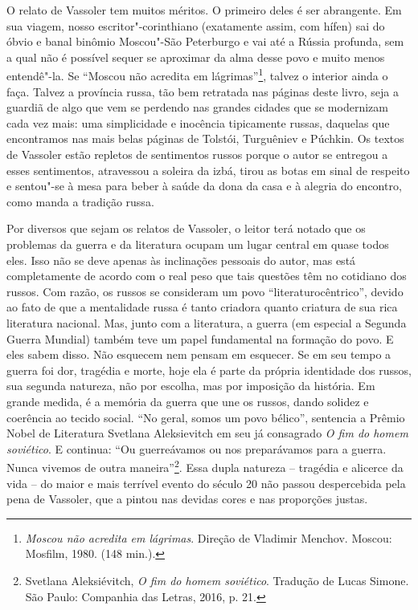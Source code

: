 O relato de Vassoler tem muitos méritos. O primeiro deles é ser
abrangente. Em sua viagem, nosso escritor"-corinthiano (exatamente assim,
com hífen) sai do óbvio e banal binômio Moscou"-São Peterburgo e vai até
a Rússia profunda, sem a qual não é possível sequer se aproximar da alma
desse povo e muito menos entendê"-la. Se ``Moscou não acredita em
lágrimas''\footnote{\emph{Moscou não acredita em lágrimas}. Direção de
  Vladimir Menchov. Moscou: Mosfilm, 1980. (148 min.).}, talvez o
interior ainda o faça. Talvez a província russa, tão bem retratada nas
páginas deste livro, seja a guardiã de algo que vem se perdendo nas
grandes cidades que se modernizam cada vez mais: uma simplicidade e
inocência tipicamente russas, daquelas que encontramos nas mais belas
páginas de Tolstói, Turguêniev e Púchkin. Os textos de Vassoler estão
repletos de sentimentos russos porque o autor se entregou a esses
sentimentos, atravessou a soleira da izbá, tirou as botas em sinal de
respeito e sentou"-se à mesa para beber à saúde da dona da casa e à
alegria do encontro, como manda a tradição russa.

Por diversos que sejam os relatos de Vassoler, o leitor terá notado que
os problemas da guerra e da literatura ocupam um lugar central em quase
todos eles. Isso não se deve apenas às inclinações pessoais do autor,
mas está completamente de acordo com o real peso que tais questões têm
no cotidiano dos russos. Com razão, os russos se consideram um povo
``literaturocêntrico'', devido ao fato de que a mentalidade russa é
tanto criadora quanto criatura de sua rica literatura nacional. Mas,
junto com a literatura, a guerra (em especial a Segunda Guerra Mundial)
também teve um papel fundamental na formação do povo. E eles sabem
disso. Não esquecem nem pensam em esquecer. Se em seu tempo a guerra foi
dor, tragédia e morte, hoje ela é parte da própria identidade dos
russos, sua segunda natureza, não por escolha, mas por imposição da
história. Em grande medida, é a memória da guerra que une os russos,
dando solidez e coerência ao tecido social. ``No geral, somos um povo
bélico'', sentencia a Prêmio Nobel de Literatura Svetlana Aleksievitch
em seu já consagrado \emph{O fim do homem soviético}. E continua: ``Ou
guerreávamos ou nos preparávamos para a guerra. Nunca vivemos de outra
maneira''\footnote{Svetlana Aleksiévitch, \emph{O fim do homem
  soviético}. Tradução de Lucas Simone. São Paulo: Companhia das Letras,
  2016, p. 21.}. Essa dupla natureza -- tragédia e alicerce da vida --
do maior e mais terrível evento do século 20 não passou despercebida
pela pena de Vassoler, que a pintou nas devidas cores e nas proporções
justas.

